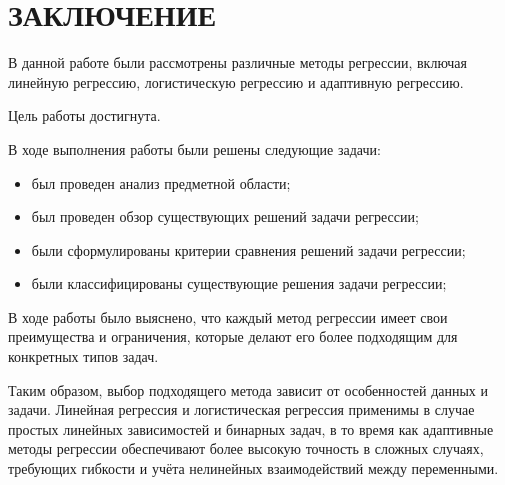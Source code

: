 \chapter*{ЗАКЛЮЧЕНИЕ}

В данной работе были рассмотрены различные методы регрессии, включая линейную регрессию, логистическую регрессию и адаптивную регрессию.

Цель работы достигнута.

В ходе выполнения работы были решены следующие задачи:
\begin{itemize}
    \item был проведен анализ предметной области;
    \item был проведен обзор существующих решений задачи регрессии;
    \item были сформулированы критерии сравнения решений задачи регрессии;
    \item были классифицированы существующие решения задачи регрессии;
\end{itemize}

В ходе работы было выяснено, что каждый метод регрессии имеет свои преимущества и ограничения, которые делают его более подходящим для конкретных типов задач.

Таким образом, выбор подходящего метода зависит от особенностей данных и задачи.
Линейная регрессия и логистическая регрессия применимы в случае простых линейных зависимостей и бинарных задач, в то время как адаптивные методы регрессии обеспечивают более высокую точность в сложных случаях, требующих гибкости и учёта нелинейных взаимодействий между переменными.